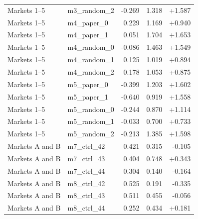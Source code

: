 \begin{longtable}{p{3.0cm}p{2.7cm}rrr}
Markets 1--5 & m3\_random\_2 & -0.269 & 1.318 & +1.587 \\
Markets 1--5 & m4\_paper\_0 & 0.229 & 1.169 & +0.940 \\
Markets 1--5 & m4\_paper\_1 & 0.051 & 1.704 & +1.653 \\
Markets 1--5 & m4\_random\_0 & -0.086 & 1.463 & +1.549 \\
Markets 1--5 & m4\_random\_1 & 0.125 & 1.019 & +0.894 \\
Markets 1--5 & m4\_random\_2 & 0.178 & 1.053 & +0.875 \\
Markets 1--5 & m5\_paper\_0 & -0.399 & 1.203 & +1.602 \\
Markets 1--5 & m5\_paper\_1 & -0.640 & 0.919 & +1.558 \\
Markets 1--5 & m5\_random\_0 & -0.244 & 0.870 & +1.114 \\
Markets 1--5 & m5\_random\_1 & -0.033 & 0.700 & +0.733 \\
Markets 1--5 & m5\_random\_2 & -0.213 & 1.385 & +1.598 \\
Markets A and B & m7\_ctrl\_42 & 0.421 & 0.315 & -0.105 \\
Markets A and B & m7\_ctrl\_43 & 0.404 & 0.748 & +0.343 \\
Markets A and B & m7\_ctrl\_44 & 0.304 & 0.140 & -0.164 \\
Markets A and B & m8\_ctrl\_42 & 0.525 & 0.191 & -0.335 \\
Markets A and B & m8\_ctrl\_43 & 0.511 & 0.455 & -0.056 \\
Markets A and B & m8\_ctrl\_44 & 0.252 & 0.434 & +0.181 \\
\end{longtable}
